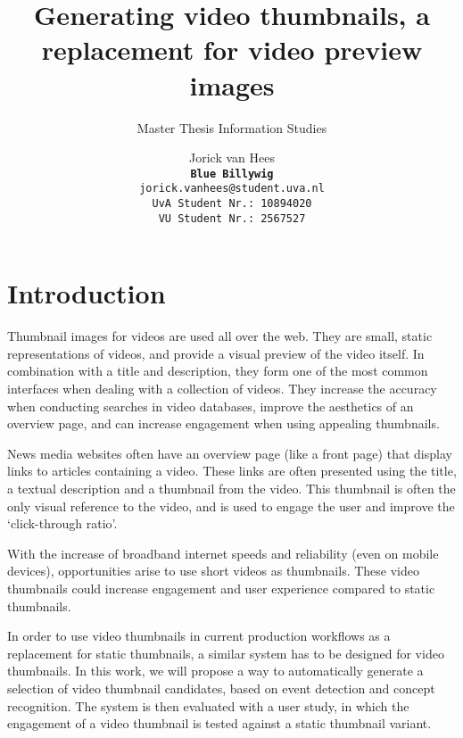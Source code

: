 \documentclass{../resources/acm_proc_article-sp}
\begin{document}
\title{Generating video thumbnails, a replacement for video preview images}
\subtitle{Master Thesis Information Studies}

\author{
Jorick van Hees \\
\texttt{\textbf{Blue Billywig}} \\
\texttt{jorick.vanhees@student.uva.nl} \\
\texttt{UvA Student Nr.: 10894020} \\
\texttt{VU Student Nr.: 2567527}
}

\maketitle



\section{Introduction}


Thumbnail images for videos are used all over the web. They are small, static representations of videos, and provide a visual preview of the video itself. In combination with a title and description, they form one of the most common interfaces when dealing with a collection of videos. They increase the accuracy when conducting searches in video databases, improve the aesthetics of an overview page, and can increase engagement when using appealing thumbnails.

News media websites often have an overview page (like a front page) that display links to articles containing a video. These links are often presented using the title, a textual description and a thumbnail from the video. This thumbnail is often the only visual reference to the video, and is used to engage the user and improve the `click-through ratio'.

With the increase of broadband internet speeds and reliability (even on mobile devices), opportunities arise to use short videos as thumbnails. These video thumbnails could increase engagement and user experience compared to static thumbnails.

In order to use video thumbnails in current production workflows as a replacement for static thumbnails, a similar system has to be designed for video thumbnails. In this work, we will propose a way to automatically generate a selection of video thumbnail candidates, based on event detection and concept recognition. The system is then evaluated with a user study, in which the engagement of a video thumbnail is tested against a static thumbnail variant.
\end{document}
